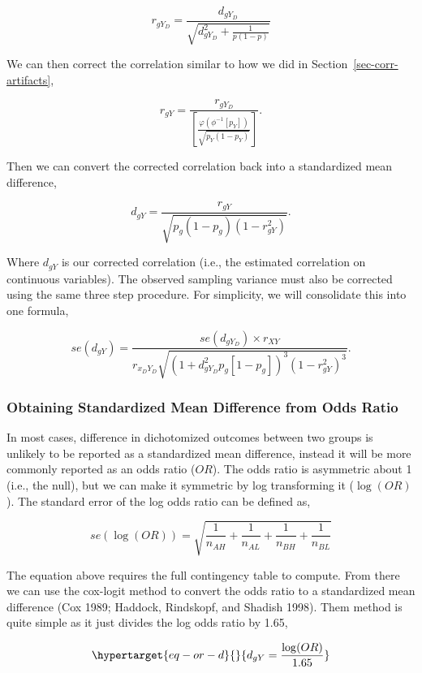\documentclass[
  letterpaper,
  DIV=11,
  numbers=noendperiod]{scrreprt}
\begin{document}
\[
r_{gY_D} = \frac{d_{gY_D}}{\sqrt{d_{gY_D}^2+\frac{1}{p(1-p)}}}
\]

We can then correct the correlation similar to how we did in
Section~\ref{sec-corr-artifacts},

\[
r_{gY} = \frac{r_{gY_D}}{\left[\frac{\varphi\left(\phi^{-1}[p_Y]\right)}{\sqrt{p_Y(1-p_Y)}}\right]}.
\]

Then we can convert the corrected correlation back into a standardized
mean difference,

\[
d_{gY} = \frac{r_{gY}}{\sqrt{p_g\left(1-p_g\right)\left(1-r_{gY}^2\right)}}.
\]

Where \(d_{gY}\) is our corrected correlation (i.e., the estimated
correlation on continuous variables). The observed sampling variance
must also be corrected using the same three step procedure. For
simplicity, we will consolidate this into one formula,

\[
se(d_{gY}) = \frac {se(d_{gY_D}) \times r_{XY}} {r_{x_DY_D}\sqrt{\left(1+d_{gY_D}^2p_g[1-p_g]\right)^3(1-r_{gY}^2)^3}}.
\]

\hypertarget{obtaining-standardized-mean-difference-from-odds-ratio}{%
\subsubsection*{Obtaining Standardized Mean Difference from Odds
Ratio}\label{obtaining-standardized-mean-difference-from-odds-ratio}}

In most cases, difference in dichotomized outcomes between two groups is
unlikely to be reported as a standardized mean difference, instead it
will be more commonly reported as an odds ratio (\(OR\)). The odds ratio
is asymmetric about 1 (i.e., the null), but we can make it symmetric by
log transforming it (\(\log(OR)\)). The standard error of the log odds
ratio can be defined as,

\[
se(\log(OR)) = \sqrt{\frac{1}{n_{AH}} + \frac{1}{n_{AL}} + \frac{1}{n_{BH}} + \frac{1}{n_{BL}}}
\]

The equation above requires the full contingency table to compute. From
there we can use the cox-logit method to convert the odds ratio to a
standardized mean difference (Cox 1989; Haddock, Rindskopf, and Shadish
1998). Them method is quite simple as it just divides the log odds ratio
by 1.65,

\begin{equation}\protect\hypertarget{eq-or-d}{}{
d_{gY} = \frac{\log(OR)}{1.65}
}\label{eq-or-d}\end{equation}
\end{document}
